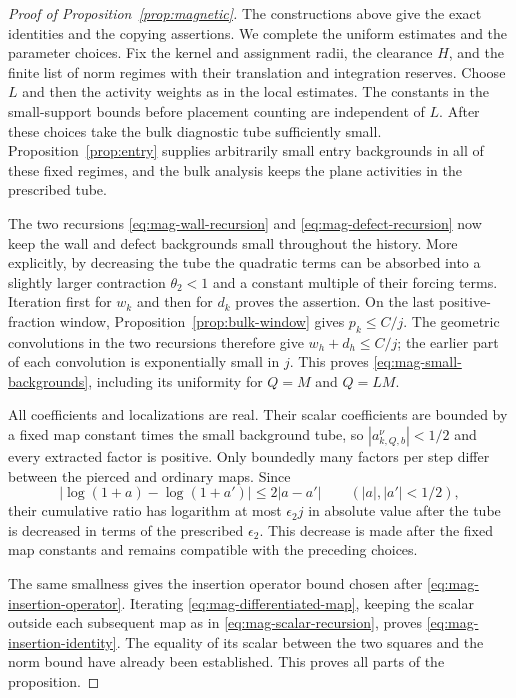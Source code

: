 \begin{proof}[Proof of Proposition~\ref{prop:magnetic}]
The constructions above give the exact identities and the copying
assertions.  We complete the uniform estimates and the parameter
choices.  Fix the kernel and assignment radii, the clearance $H$,
and the finite list of norm regimes with their translation and
integration reserves.  Choose $L$ and then the activity weights
as in the local estimates.  The constants in the small-support
bounds before placement counting are independent of $L$.
After these choices take the bulk diagnostic tube sufficiently
small.  Proposition~\ref{prop:entry} supplies arbitrarily small
entry backgrounds in all of these fixed regimes, and the bulk
analysis keeps the plane activities in the prescribed tube.

The two recursions \eqref{eq:mag-wall-recursion} and
\eqref{eq:mag-defect-recursion} now keep the wall and defect
backgrounds small throughout the history.  More explicitly, by
decreasing the tube the quadratic terms can be absorbed into a
slightly larger contraction $\theta_2<1$ and a constant multiple
of their forcing terms.  Iteration first for $w_k$ and then for
$d_k$ proves the assertion.  On the last positive-fraction window,
Proposition~\ref{prop:bulk-window} gives $p_k\le C/j$.
The geometric convolutions in the two recursions therefore give
$w_h+d_h\le C/j$; the earlier part of each convolution is
exponentially small in $j$.  This proves
\eqref{eq:mag-small-backgrounds}, including its uniformity for
$Q=M$ and $Q=LM$.

All coefficients and localizations are real.  Their scalar
coefficients are bounded by a fixed map constant times the small
background tube, so $|a^\nu_{k,Q,b}|<1/2$ and every extracted
factor is positive.  Only boundedly many factors per step differ
between the pierced and ordinary maps.  Since
\[
 |\log(1+a)-\log(1+a')|\le2|a-a'|
 \qquad (|a|,|a'|<1/2),
\]
their cumulative ratio has logarithm at most $\epsilon_2j$ in
absolute value after the tube is decreased in terms of the
prescribed $\epsilon_2$.  This decrease is made after the fixed map
constants and remains compatible with the preceding choices.

The same smallness gives the insertion operator bound chosen
after \eqref{eq:mag-insertion-operator}.  Iterating
\eqref{eq:mag-differentiated-map}, keeping the scalar outside each
subsequent map as in \eqref{eq:mag-scalar-recursion}, proves
\eqref{eq:mag-insertion-identity}.  The equality of its scalar
between the two squares and the norm bound have already been
established.  This proves all parts of the proposition.
\end{proof}
